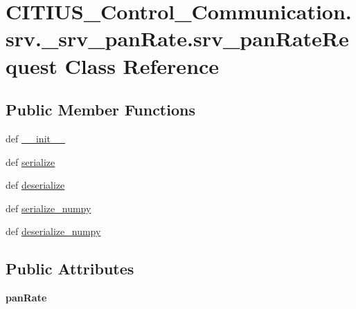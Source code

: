 \hypertarget{class_c_i_t_i_u_s___control___communication_1_1srv_1_1__srv__pan_rate_1_1srv__pan_rate_request}{\section{\-C\-I\-T\-I\-U\-S\-\_\-\-Control\-\_\-\-Communication.\-srv.\-\_\-srv\-\_\-pan\-Rate.\-srv\-\_\-pan\-Rate\-Request \-Class \-Reference}
\label{class_c_i_t_i_u_s___control___communication_1_1srv_1_1__srv__pan_rate_1_1srv__pan_rate_request}
}
\subsection*{\-Public \-Member \-Functions}
\begin{DoxyCompactItemize}
\item 
def \hyperlink{class_c_i_t_i_u_s___control___communication_1_1srv_1_1__srv__pan_rate_1_1srv__pan_rate_request_a413b528f37b5123a7bb3b376fb39b7e4}{\-\_\-\-\_\-init\-\_\-\-\_\-}
\item 
def \hyperlink{class_c_i_t_i_u_s___control___communication_1_1srv_1_1__srv__pan_rate_1_1srv__pan_rate_request_ac7cae4646557154334f30a5ba894b033}{serialize}
\item 
def \hyperlink{class_c_i_t_i_u_s___control___communication_1_1srv_1_1__srv__pan_rate_1_1srv__pan_rate_request_a081c1c2fa79b6e49e104cb3f41c069b0}{deserialize}
\item 
def \hyperlink{class_c_i_t_i_u_s___control___communication_1_1srv_1_1__srv__pan_rate_1_1srv__pan_rate_request_a7804d300a38e580763c73ed3a80b2bbe}{serialize\-\_\-numpy}
\item 
def \hyperlink{class_c_i_t_i_u_s___control___communication_1_1srv_1_1__srv__pan_rate_1_1srv__pan_rate_request_a7227f7e0aa785d245f0e9f354afb332d}{deserialize\-\_\-numpy}
\end{DoxyCompactItemize}
\subsection*{\-Public \-Attributes}
\begin{DoxyCompactItemize}
\item 
\hypertarget{class_c_i_t_i_u_s___control___communication_1_1srv_1_1__srv__pan_rate_1_1srv__pan_rate_request_a646f68b79b2d5bf7a152695fd2837043}{{\bfseries pan\-Rate}}\label{class_c_i_t_i_u_s___control___communication_1_1srv_1_1__srv__pan_rate_1_1srv__pan_rate_request_a646f68b79b2d5bf7a152695fd2837043}

\end{DoxyCompactItemize}
